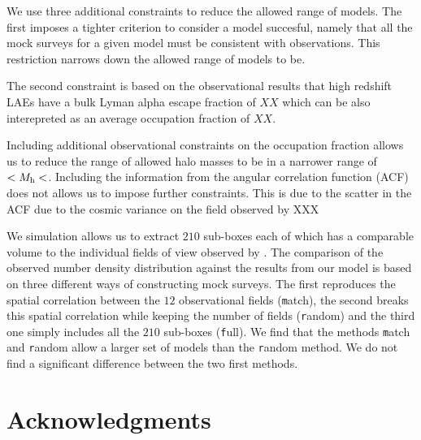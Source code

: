 \documentclass[usenatbib]{mn2e}
\begin{document}
We use three additional constraints to reduce the allowed
range of models. The first imposes a tighter criterion to consider a
model succesful, namely that all the mock surveys for a given model
must be consistent with observations. This restriction narrows down
the allowed range of models to be. 

The second constraint is based on the observational results that high
redshift LAEs have a bulk Lyman alpha escape fraction of $XX$ which
can be also interepreted as an average occupation fraction of $XX$.

Including additional observational constraints on the occupation
fraction allows us to reduce the range of allowed halo masses to be in
a narrower range of $<M_{\rm h}<$. Including the information from the
angular correlation function (ACF) does not allows us to impose
further constraints. This is due to the scatter in the ACF due to the
cosmic variance on the field observed by XXX


We simulation allows us to extract $210$ sub-boxes each of which has a
comparable volume to the individual fields of view observed by
\cite{Yamada2012}. The comparison of the observed number density
distribution against the results from our model is based on three
different ways of constructing mock surveys. The first reproduces the
spatial correlation between the $12$ observational fields ({\texttt
  match}), the second breaks this spatial correlation while keeping
the number of fields ({\texttt random}) and the third one simply
includes all the $210$ sub-boxes ({\texttt full}). We find that the
methods {\texttt match} and {\texttt random} allow a larger set of
models than the {{\texttt random}} method. We do not find a
significant difference between the two first methods. 


\section*{Acknowledgments} 
\end{document}
